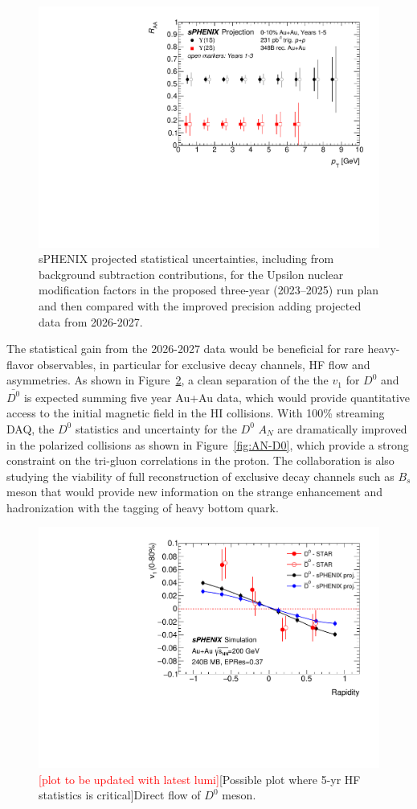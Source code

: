 \begin{figure}
    \centering
    \includegraphics[width=0.50\linewidth]{figs/upsilon_RAA_2}
    \caption{sPHENIX projected statistical uncertainties,  including from background subtraction contributions, for the Upsilon nuclear modification factors in the proposed three-year (2023–2025) run plan and then compared with the improved precision adding projected data from 2026-2027.}
    \label{fig:RAA_upsilon_extrayears}
\end{figure}

The statistical gain from the 2026-2027 data would be beneficial for rare heavy-flavor observables, in particular for exclusive decay channels, HF flow and asymmetries. As shown in Figure~\ref{fig:v1-D0}, a clean separation of the the $v_1$ for $D^0$ and $\bar{D^0}$ is expected summing five year Au+Au data, which would provide quantitative access to the initial magnetic field in the HI collisions. With 100\% streaming DAQ, the $D^0$ statistics and uncertainty for the $D^0$ $A_N$ are dramatically improved in the polarized \pp collisions as shown in Figure~\ref{fig:AN-D0}, which provide a strong constraint on the tri-gluon correlations in the proton. 
The collaboration is also studying the viability of full reconstruction of exclusive decay channels such as $B_s$ meson that would provide new information on the strange enhancement and hadronization with the tagging of heavy bottom quark.  
 
\begin{figure}[h]
\begin{center}
\includegraphics[width=.49\linewidth]{figs/v1_proj_240B_1.pdf}
\caption{ {\textcolor{red}{[plot to be updated with latest lumi]}}[Possible plot where  5-yr HF statistics is critical]Direct flow of $D^0$ meson.}
\label{fig:v1-D0}
\end{center}
\end{figure}
 


